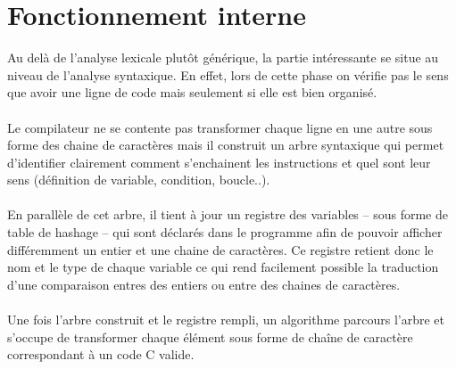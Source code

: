 \documentclass{article}
\begin{document}
\section{Fonctionnement interne}
Au delà de l'analyse lexicale plutôt générique, la partie intéressante se situe au niveau
de l'analyse syntaxique. En effet, lors de cette phase on vérifie pas le sens que avoir 
une ligne de code mais 
seulement si elle est bien organisé. 
\\\\
Le compilateur ne se contente pas transformer 
chaque ligne en une autre sous forme des chaine de caractères mais il construit un 
arbre syntaxique qui permet d'identifier clairement comment s'enchainent les instructions
et quel sont leur sens (définition de variable, condition, boucle..).
\\\\
En parallèle de cet arbre, il tient à jour un registre des variables -- sous forme de 
table de hashage -- qui sont déclarés dans le programme afin de pouvoir afficher 
différemment un entier et une chaine de caractères. Ce registre retient donc le nom et le
type de chaque variable ce qui rend facilement possible la traduction d'une comparaison 
entres des entiers ou entre des chaines de caractères.
\\\\
Une fois l'arbre construit et le registre rempli, un algorithme parcours l'arbre et 
s'occupe de transformer chaque élément sous forme de chaîne de caractère correspondant
à un code C valide.
\end{document}
